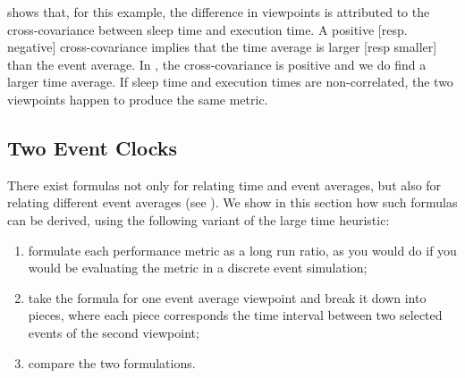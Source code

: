  shows that, for this example, the difference
in viewpoints is attributed to the cross-covariance between
sleep time and execution time. A positive [resp. negative]
cross-covariance implies that the time average is larger [resp
smaller] than the event average. In , the
cross-covariance is positive and we do find a larger time
average. If sleep time and execution times are non-correlated,
the two viewpoints happen to produce the same metric.


%

\subsection{Two Event Clocks}
There exist formulas not only for relating time and event averages,
but also for relating different event averages (see
). We show in this section how such formulas can
be derived, using the following variant of the large time heuristic:
\begin{enumerate}
    \item formulate each performance metric as a long run ratio, as
    you would do if you would be evaluating the metric in a discrete event
    simulation;
    \item take the formula for one event average viewpoint and break it down into
    pieces, where each piece corresponds the time interval between two selected
    events of the second viewpoint;
    \item compare the two formulations.
\end{enumerate}


